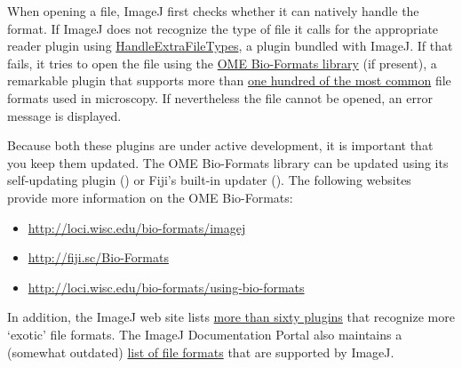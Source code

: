 When opening a file, ImageJ first checks whether it can natively handle
the format. If ImageJ does not recognize
the type of file it calls for the appropriate reader plugin using
\href{http://imagej.nih.gov/ij/plugins/file-handler.html}{HandleExtraFileTypes},
a plugin bundled with ImageJ. If that fails, it tries to open the
file using the \href{http://loci.wisc.edu/software/bio-formats}{OME Bio-Formats library}
(if present), a remarkable plugin that supports more than \href{http://loci.wisc.edu/bio-formats/formats}{one hundred of the most common}
file formats used in microscopy. If nevertheless the file cannot be
opened, an error message is displayed. 

Because both these plugins are under active development, it is important
that you keep them updated. The OME Bio-Formats library can be updated
using its self-updating plugin ()
or Fiji\textuparrow{}'s built-in updater ().
The following websites provide more information on the OME Bio-Formats:
\begin{itemize}
\item \href{http://loci.wisc.edu/bio-formats/imagej}{http://loci.wisc.edu/bio-formats/imagej}
\item \href{http://fiji.sc/Bio-Formats}{http://fiji.sc/Bio-Formats}
\item \href{http://loci.wisc.edu/bio-formats/using-bio-formats}{http://loci.wisc.edu/bio-formats/using-bio-formats}
\end{itemize}
In addition, the ImageJ web site lists \href{http://imagej.nih.gov/ij/plugins/\#io}{more than sixty plugins}
that recognize more `exotic' file formats. The ImageJ Documentation
Portal also maintains a (somewhat outdated) \href{http://imagejdocu.tudor.lu/doku.php?id=faq:general:which_file_formats_are_supported_by_imagej}{list of file formats}
that are supported by ImageJ.



